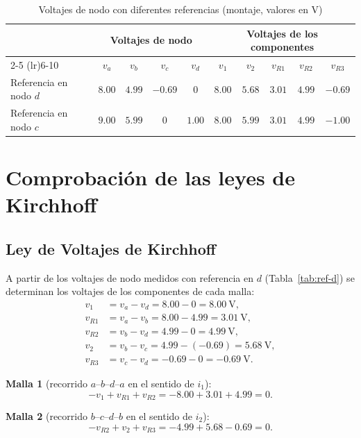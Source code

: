\documentclass[conference,10pt]{IEEEtran}
\begin{document}
\begin{table}[!t]
  \caption{Voltajes de nodo con diferentes referencias (montaje, valores en V)}
  \label{tab:referencias}
  \centering
  \begin{tabular}{lccccccccc}
    \toprule
    & \multicolumn{4}{c}{Voltajes de nodo} & \multicolumn{5}{c}{Voltajes de los componentes} \\
    \cmidrule(lr){2-5} \cmidrule(lr){6-10}
    & $v_a$ & $v_b$ & $v_c$ & $v_d$ & $v_1$ & $v_2$ & $v_{R1}$ & $v_{R2}$ & $v_{R3}$ \\
    \midrule
    Referencia en nodo $d$ & $8.00$ & $4.99$ & $-0.69$ & $0$    & $8.00$ & $5.68$ & $3.01$ & $4.99$ & $-0.69$ \\
    Referencia en nodo $c$ & $9.00$ & $5.99$ & $0$     & $1.00$ & $8.00$ & $5.99$ & $3.01$ & $4.99$ & $-1.00$ \\
    \bottomrule
  \end{tabular}
\end{table}

\section{Comprobación de las leyes de Kirchhoff}
\subsection{Ley de Voltajes de Kirchhoff}
A partir de los voltajes de nodo medidos con referencia en $d$ (Tabla~\ref{tab:ref-d}) se determinan los voltajes de los componentes de cada malla:
\begin{align*}
  v_1    &= v_a - v_d = 8.00 - 0 = 8.00~\mathrm{V},\\
  v_{R1} &= v_a - v_b = 8.00 - 4.99 = 3.01~\mathrm{V},\\
  v_{R2} &= v_b - v_d = 4.99 - 0 = 4.99~\mathrm{V},\\
  v_2    &= v_b - v_c = 4.99 - (-0.69) = 5.68~\mathrm{V},\\
  v_{R3} &= v_c - v_d = -0.69 - 0 = -0.69~\mathrm{V}.
\end{align*}

\textbf{Malla 1} (recorrido $a$--$b$--$d$--$a$ en el sentido de $i_1$):
\begin{equation*}
  -v_1 + v_{R1} + v_{R2} = -8.00 + 3.01 + 4.99 = 0.
\end{equation*}

\textbf{Malla 2} (recorrido $b$--$c$--$d$--$b$ en el sentido de $i_2$):
\begin{equation*}
  -v_{R2} + v_2 + v_{R3} = -4.99 + 5.68 - 0.69 = 0.
\end{equation*}
\end{document}
